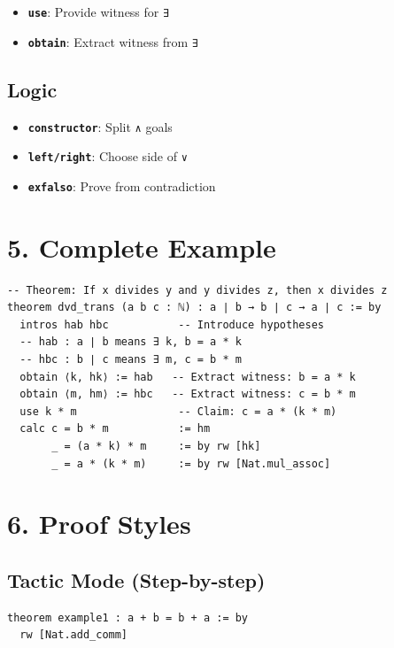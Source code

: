 \documentclass{amsart}
\theoremstyle{plain}
\theoremstyle{definition}
\theoremstyle{remark}
\begin{document}
\begin{itemize}
	\item \textbf{\lstinline{use}}: Provide witness for \lstinline{∃}
	\item \textbf{\lstinline{obtain}}: Extract witness from \lstinline{∃}
\end{itemize}

\subsection{\textbf{Logic}}

\begin{itemize}
	\item \textbf{\lstinline{constructor}}: Split \lstinline{∧} goals
	\item \textbf{\lstinline{left/right}}: Choose side of \lstinline{∨}
	\item \textbf{\lstinline{exfalso}}: Prove from contradiction
\end{itemize}


\section{\textbf{5. Complete Example}}

\begin{lstlisting}[language=lean]
-- Theorem: If x divides y and y divides z, then x divides z
theorem dvd_trans (a b c : ℕ) : a ∣ b → b ∣ c → a ∣ c := by
  intros hab hbc           -- Introduce hypotheses
  -- hab : a ∣ b means ∃ k, b = a * k
  -- hbc : b ∣ c means ∃ m, c = b * m
  obtain ⟨k, hk⟩ := hab   -- Extract witness: b = a * k
  obtain ⟨m, hm⟩ := hbc   -- Extract witness: c = b * m
  use k * m                -- Claim: c = a * (k * m)
  calc c = b * m           := hm
       _ = (a * k) * m     := by rw [hk]
       _ = a * (k * m)     := by rw [Nat.mul_assoc]
\end{lstlisting}

\section{\textbf{6. Proof Styles}}

\subsection{\textbf{Tactic Mode} (Step-by-step)}

\begin{lstlisting}[language=lean]
theorem example1 : a + b = b + a := by
  rw [Nat.add_comm]
\end{lstlisting}
\end{document}
